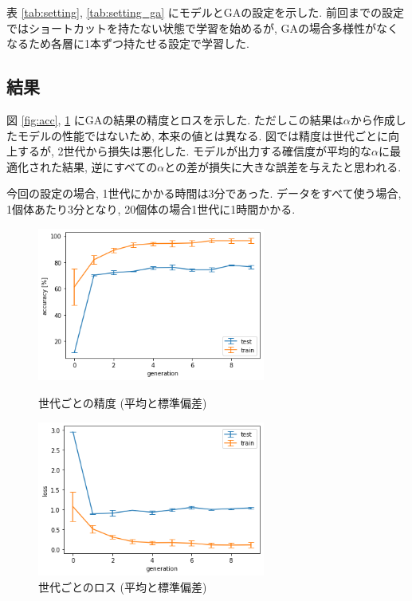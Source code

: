 \documentclass[twocolumn]{jarticle}     %
\begin{document}
表 \ref{tab:setting}, \ref{tab:setting_ga} にモデルとGAの設定を示した.
前回までの設定ではショートカットを持たない状態で学習を始めるが,
GAの場合多様性がなくなるため各層に1本ずつ持たせる設定で学習した.

\subsection{結果}

図 \ref{fig:acc}, \ref{fig:loss} にGAの結果の精度とロスを示した.
ただしこの結果は$\alpha$から作成したモデルの性能ではないため,
本来の値とは異なる.
図では精度は世代ごとに向上するが, 2世代から損失は悪化した.
モデルが出力する確信度が平均的な$\alpha$に最適化された結果,
逆にすべての$\alpha$との差が損失に大きな誤差を与えたと思われる.

今回の設定の場合, 1世代にかかる時間は3分であった.
データをすべて使う場合, 1個体あたり3分となり, 20個体の場合1世代に1時間かかる.

\begin{figure}[tb]
 \begin{minipage}{0.5\hsize}
 	\begin{center}
 		\includegraphics[clip,width=75mm]{acc.png}
 		\caption{世代ごとの精度 (平均と標準偏差)}
 		\label{fig:acc}
 	\end{center}
 \end{minipage}
 \begin{minipage}{0.5\hsize}
 	\begin{center}
 		\includegraphics[clip,width=75mm]{loss.png}
 		\caption{世代ごとのロス (平均と標準偏差)}
 		\label{fig:loss}
 	\end{center}
 \end{minipage}
\end{figure}
\end{document}
